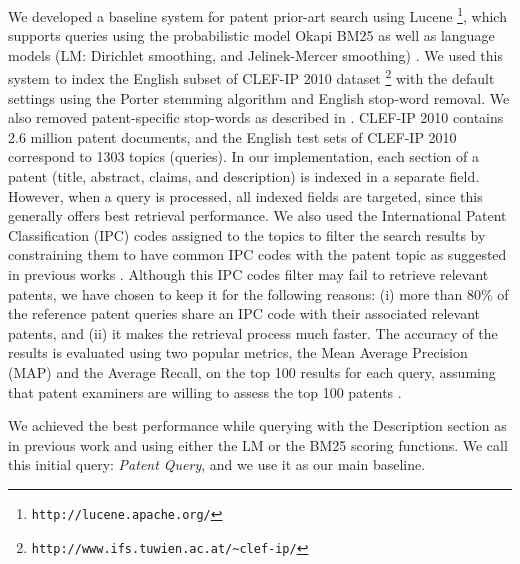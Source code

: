 We developed a baseline system for patent prior-art search using
Lucene%
\footnote{\texttt{http://lucene.apache.org/}%
}, which supports queries using the probabilistic
model Okapi BM25 \cite{Robertson1993} as well as language models (LM: Dirichlet
smoothing, and Jelinek-Mercer smoothing) \cite{Zhai2001}. We used
this system to index the English subset of CLEF-IP 2010 dataset%
\footnote{\texttt{http://www.ifs.tuwien.ac.at/\textasciitilde{}clef-ip/}%
} with the default settings using the Porter stemming algorithm \cite{Porter1980} and English stop-word removal. 
We also removed patent-specific stop-words as described in \cite{magdy2012toward}.
CLEF-IP 2010 contains 2.6 million patent documents, and the English
test sets of CLEF-IP 2010 correspond to 1303 topics (queries). In
our implementation, each section of a patent (title, abstract, claims,
and description) is indexed in a separate field. However, when a query
is processed, all indexed fields are targeted, since this generally
offers best retrieval performance. We also used the International
Patent Classification (IPC) codes assigned to the topics to filter
the search results by constraining them to have common IPC codes with
the patent topic as suggested in previous works \cite{lopez2010patatras}.
Although this IPC codes filter may fail to retrieve relevant patents, we
have chosen to keep it for the following reasons: (i) more than 80\%
of the reference patent queries share an IPC code with their associated relevant
patents, and (ii) it makes the retrieval process much faster. The accuracy of the results is evaluated using two popular metrics, the Mean Average Precision (MAP) and the Average Recall, on the top 100 results for each query, assuming that patent examiners are willing to assess the top 100 patents \cite{joho2010survey}. 

We achieved the best performance while querying with the Description
section as in previous work \cite{xue2009transforming} and using
either the LM or the BM25 scoring functions. We call this initial
query: \emph{Patent Query}, and we use it as our main baseline.

% 